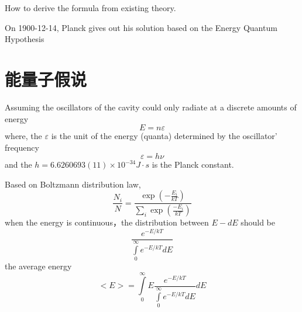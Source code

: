 \begin{frame}
    \begin{tcolorbox}[colback=yellow!5,colframe=yellow!75!black,title=The problem]
        How to derive the formula from existing theory.
    \end{tcolorbox}
    \begin{tcolorbox}[colback=yellow!10,colframe=red!75!black,title=Solution]
        On 1900-12-14, Planck gives out his solution based on the Energy Quantum Hypothesis  
    \end{tcolorbox}
\end{frame}

\section{能量子假说}
\begin{frame}
    \begin{tcolorbox}[colback=yellow!10,colframe=red!75!black,title=Energy quantum hypothesis]
    Assuming the oscillators of the cavity could only radiate at a discrete amounts of energy
    \begin{equation}
        E=n\varepsilon
    \end{equation}
    where, the $\varepsilon$ is the unit of the energy (quanta) determined by the oscillator' frequency 
    \begin{equation}
        \varepsilon=h\nu
    \end{equation}
    and the $h=6.6260693(11)×10^{-34} J\cdot s $ is the Planck constant. 
    \end{tcolorbox}
\end{frame}

\begin{frame}
    Based on Boltzmann distribution law,
    \begin{equation*}
        \frac{N_{i}}{N}=\frac{\exp \left(-\frac{E_{i}}{k T}\right)}{\sum_{i} \exp \left(\frac{-E_{i}}{k T}\right)}
    \end{equation*}
    \bullet when the energy is continuous，the distribution between $E - dE$ should be 
    \begin{equation*}
        \frac{e^{-E / k T}}{\int\limits_{0}^{\infty} e^{-E / k T} d E}
    \end{equation*}  
    the average energy 
    \begin{equation*}
        <E>=\int\limits_{0}^{\infty} E \frac{e^{-E / k T}}{\int\limits_{0}^{\infty} e^{-E / k T} d E} d E
    \end{equation*}
\end{frame}

